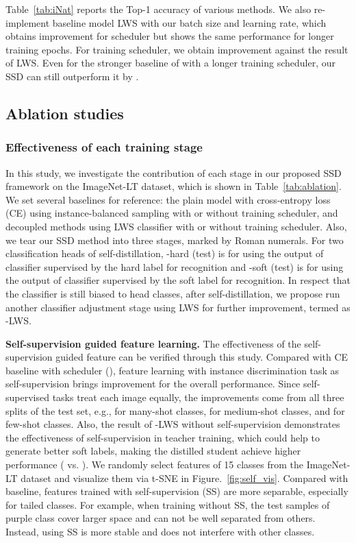 \documentclass[10pt,twocolumn,letterpaper]{article}
\begin{document}
Table~\ref{tab:iNat} reports the Top-1 accuracy of various methods. We also re-implement baseline model LWS with our batch size and learning rate, which obtains  improvement for  scheduler but shows the same performance for longer training epochs. For  training scheduler, we obtain  improvement against the result of LWS. Even for the stronger baseline of  with a longer training scheduler, our SSD can still outperform it by .

\subsection{Ablation studies}
\label{subsec:ablation}
\subsubsection{Effectiveness of each training stage}
In this study, we investigate the contribution of each stage in our proposed SSD framework on the ImageNet-LT dataset, which is shown in Table~\ref{tab:ablation}. We set several baselines for reference: the plain model with cross-entropy loss (CE) using instance-balanced sampling with or without  training scheduler, and decoupled methods using LWS classifier with or without  training scheduler.
Also, we tear our SSD method into three stages, marked by Roman numerals. For two classification heads of self-distillation, \uppercase\expandafter{}-hard (test) is for using the output of classifier  supervised by the hard label for recognition and \uppercase\expandafter{}-soft (test) is for using the output of classifier  supervised by the soft label for recognition. In respect that the classifier  is still biased to head classes, after self-distillation, we propose run another classifier adjustment stage using LWS for further improvement, termed as \uppercase\expandafter{}-LWS.


\medskip
\noindent\textbf{Self-supervision guided feature learning.} The effectiveness of the self-supervision guided feature can be verified through this study. Compared with CE baseline with  scheduler (), feature learning with instance discrimination task as self-supervision brings  improvement for the overall performance. Since self-supervised tasks treat each image equally, the improvements come from all three splits of the test set, e.g.,  for many-shot classes,  for medium-shot classes, and  for few-shot classes. Also, the result of \uppercase\expandafter{}-LWS without self-supervision demonstrates the effectiveness of self-supervision in teacher training, which could help to generate better soft labels, making the distilled student achieve higher performance ( vs. ). We randomly select features of 15 classes from the ImageNet-LT dataset and visualize them via t-SNE in Figure.~\ref{fig:self_vis}. Compared with baseline, features trained with self-supervision (SS) are more separable, especially for tailed classes. For example, when training without SS, the test samples of purple class cover larger space and can not be well separated from others. Instead, using SS is more stable and does not interfere with other classes.
\end{document}
